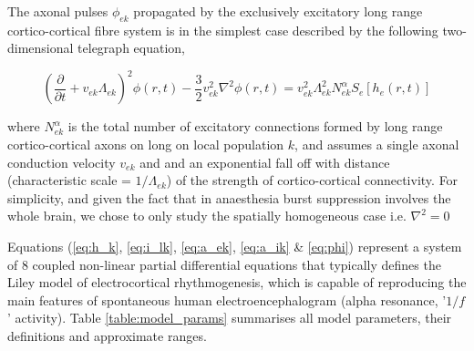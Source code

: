 \documentclass[a4paper,12pt]{article}
\begin{document}
The axonal pulses $\phi_{ek}$ propagated by the exclusively excitatory long
range cortico-cortical fibre system is in the simplest case described by
the following two-dimensional telegraph equation,

\begin{equation} \label{eq:phi}
\left(\frac{\partial}{\partial t} + v_{ek} \Lambda_{ek} \right)^2 \phi(r,t) - \frac{3}{2} v_{ek}^2
\nabla^2\phi(r,t)=v_{ek}^2 \Lambda_{ek}^2 N_{ek}^\alpha S_e[h_e(r,t)]
\end{equation}

where $N_{ek}^\alpha$ is the total number of excitatory connections formed by
long range cortico-cortical axons on long on local population $k$, and
assumes a single axonal conduction velocity $v_{ek}$ and and an exponential fall
off with distance (characteristic scale = $1/\Lambda_{ek}$) of the strength of
cortico-cortical connectivity. For simplicity, and given the fact that in
anaesthesia burst suppression involves the whole brain, we chose to
only study the spatially homogeneous case i.e. $\nabla^2 = 0$

Equations (\ref{eq:h_k}, \ref{eq:i_lk}, \ref{eq:a_ek}, \ref{eq:a_ik} \& \ref{eq:phi}) represent a system of 8 coupled
non-linear partial
differential equations that typically defines the Liley model of
electrocortical rhythmogenesis, which is capable of reproducing the
main features of spontaneous human electroencephalogram (alpha
resonance, '$1/f$' activity). Table \ref{table:model_params} summarises all model parameters,
their definitions and approximate ranges. 
\end{document}
